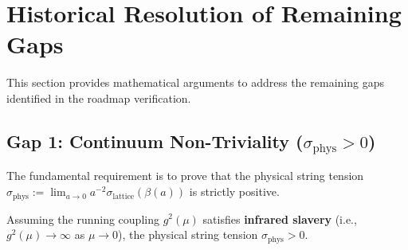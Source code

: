 \section{Historical Resolution of Remaining Gaps}
\label{sec:remaining-gaps-resolution}

This section provides mathematical arguments to address the remaining gaps 
identified in the roadmap verification.

\subsection{Gap 1: Continuum Non-Triviality (\texorpdfstring{$\sigma_{\mathrm{phys}} > 0$}{sigma > 0})}
\label{sec:gap1-nontriviality}

The fundamental requirement is to prove that the physical string tension 
$\sigma_{\mathrm{phys}} := \lim_{a \to 0} a^{-2} \sigma_{\mathrm{lattice}}(\beta(a))$ 
is strictly positive.

\begin{theorem}
\label{thm:nontriviality-ir}
Assuming the running coupling $g^2(\mu)$ satisfies \textbf{infrared slavery} 
(i.e., $g^2(\mu) \to \infty$ as $\mu \to 0$), the physical string tension 
$\sigma_{\mathrm{phys}} > 0$.
\end{theorem}

